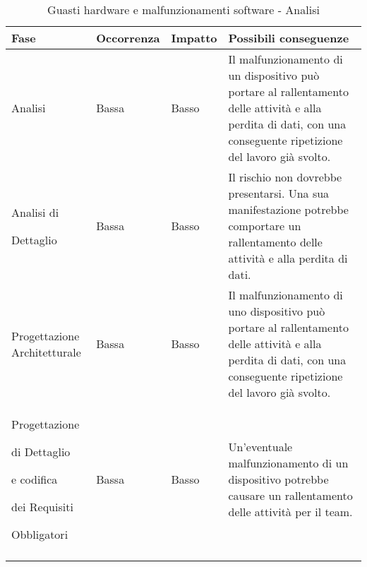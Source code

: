 \documentclass[../PianoProgetto.tex]{subfiles}
\begin{document}
	\hspace{0pt}
		\begin{longtabu} to \textwidth {X[.55] X[c .50] X[c .50] X}
			\toprule
			\textbf{Fase} & \textbf{Occorrenza} & \textbf{Impatto} & \textbf{Possibili conseguenze}\\
			\midrule
			\endhead			
			
			Analisi & Bassa & Basso & Il malfunzionamento di un dispositivo può portare al rallentamento delle attività e alla perdita di dati, con una conseguente ripetizione del lavoro già svolto. \\
			\midrule
			Analisi di \par Dettaglio & Bassa & Basso & Il rischio non dovrebbe presentarsi. Una sua manifestazione potrebbe comportare un rallentamento delle attività e alla perdita di dati. \\
			\midrule
			Progettazione Architetturale & Bassa & Basso & Il malfunzionamento di uno dispositivo può portare al rallentamento delle attività e alla perdita di dati, con una conseguente ripetizione del lavoro già svolto. \\
			\midrule
			Progettazione \par di Dettaglio \par e codifica \par dei Requisiti \par Obbligatori & Bassa & Basso & Un'eventuale malfunzionamento di un dispositivo potrebbe causare un rallentamento delle attività per il team.\\
			\bottomrule
			
			\caption{Guasti hardware e malfunzionamenti software - Analisi}
			\label{tab:Guasti hardware e malfunzionamenti software - Analisi}	
		\end{longtabu}
\end{document}
